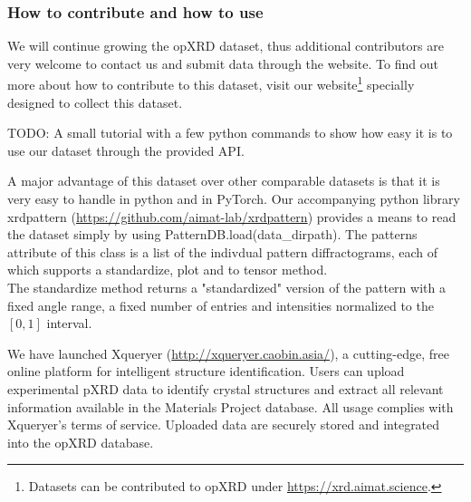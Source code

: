 \subsubsection*{How to contribute and how to use}

We will continue growing the opXRD dataset, thus additional contributors are very welcome to contact us and submit data through the website. To find out more about how to contribute to this dataset, visit our website\footnote{Datasets can be contributed to opXRD under \url{https://xrd.aimat.science}.} specially designed to collect this dataset.

TODO: A small tutorial with a few python commands to show how easy it is to use our dataset through the provided API.

A major advantage of this dataset over other comparable datasets is that it is very easy to handle in python and in PyTorch.
Our accompanying python library xrdpattern (\url{https://github.com/aimat-lab/xrdpattern}) provides a means to read the dataset simply by using PatternDB.load(data\_dirpath). The patterns attribute of this class is a list of the indivdual pattern diffractograms, each of which supports a standardize, plot and to tensor method. \\
The standardize method returns a "standardized" version of the pattern with a fixed angle range, a fixed number of entries and intensities normalized to the $[0,1]$ interval.

% 
We have launched Xqueryer (\url{http://xqueryer.caobin.asia/}), a cutting-edge, free online platform for intelligent structure identification. Users can upload experimental pXRD data to identify crystal structures and extract all relevant information available in the Materials Project database. All usage complies with Xqueryer's terms of service. Uploaded data are securely stored and integrated into the opXRD database.